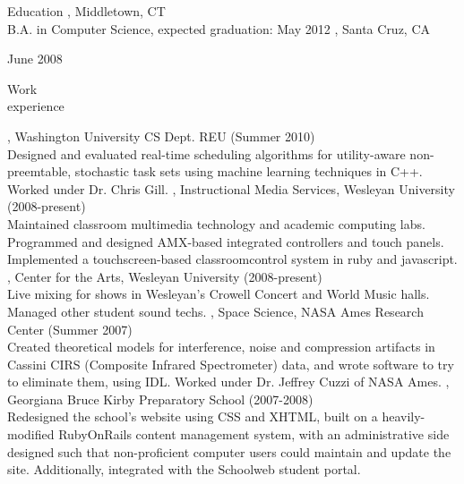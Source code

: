 \documentclass{/Users/mwylde/.rvm/gems/ruby-1.9.2-p0/gems/resume-0.1.0/lib/resume/templates/resume}
\author{Micah Wylde}
\begin{document}
\maketitle

    
\begin{category}{Education}
    , Middletown, CT
    \\B.A. in Computer Science, 
    expected graduation: May 2012
    , Santa Cruz, CA
     
    June 2008
\end{category}


\begin{category}{Work \\experience}

     , Washington University CS Dept. REU (Summer 2010)\\
        Designed and evaluated real-time scheduling algorithms for utility-aware non-preemtable, stochastic task sets using machine learning techniques in C++. Worked under Dr. Chris Gill.
     , Instructional Media Services, Wesleyan University (2008-present)\\
        Maintained classroom multimedia technology and academic computing labs. Programmed and designed AMX-based integrated controllers and touch panels. Implemented a touchscreen-based classroomcontrol system in ruby and javascript.
     , Center for the Arts, Wesleyan University (2008-present)\\
        Live mixing for shows in Wesleyan's Crowell Concert and World Music halls. Managed other student sound techs.
     , Space Science, NASA Ames Research Center (Summer 2007)\\
        Created theoretical models for interference, noise and compression artifacts in Cassini CIRS (Composite Infrared Spectrometer) data, and wrote software to try to eliminate them, using IDL. Worked under Dr. Jeffrey Cuzzi of NASA Ames.
     , Georgiana Bruce Kirby Preparatory School (2007-2008)\\
        Redesigned the school’s website using CSS and XHTML, built on a heavily-modified RubyOnRails content management system, with an administrative side designed such that non-proficient computer users could maintain and update the site. Additionally, integrated with the Schoolweb student portal.
\end{category}
\end{document}
